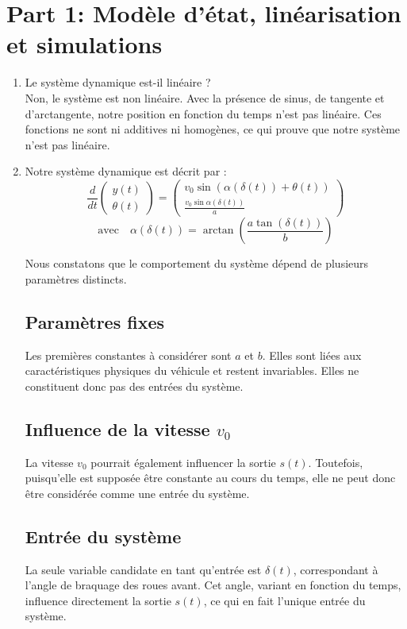 \documentclass[a4paper, 11pt]{article}
\begin{document}
\section*{Part 1: Modèle d'état, linéarisation et simulations}
\begin{enumerate}
    \item 
    Le système dynamique est-il linéaire ? \\
Non, le système est non linéaire. Avec la présence de sinus, de tangente et d'arctangente, notre position en fonction du temps n'est pas linéaire. Ces fonctions ne sont ni additives ni homogènes, ce qui prouve que notre système n'est pas linéaire.

    \item 
    
Notre système dynamique est décrit par :  
\[
\frac{d}{dt} 
\begin{pmatrix} 
y(t) \\ \theta(t) 
\end{pmatrix} 
=
\begin{pmatrix} 
v_0 \sin(\alpha(\delta(t)) + \theta(t)) \\ 
\frac{v_0 \sin \alpha(\delta(t))}{a} 
\end{pmatrix}
\]
\[
\text{avec} \quad \alpha(\delta(t)) = \arctan \left( \frac{a \tan(\delta(t))}{b} \right)
\]

Nous constatons que le comportement du système dépend de plusieurs paramètres distincts.  

\subsection*{Paramètres fixes}  
Les premières constantes à considérer sont \( a \) et \( b \). Elles sont liées aux caractéristiques physiques du véhicule et restent invariables. Elles ne constituent donc pas des entrées du système.  

\subsection*{Influence de la vitesse \( v_0 \)}  
La vitesse \( v_0 \) pourrait également influencer la sortie \( s(t) \). Toutefois, puisqu'elle est supposée être constante au cours du temps, elle ne peut donc être considérée comme une entrée du système.  

\subsection*{Entrée du système}  
La seule variable candidate en tant qu’entrée est \( \delta(t) \), correspondant à l’angle de braquage des roues avant. Cet angle, variant en fonction du temps, influence directement la sortie \( s(t) \), ce qui en fait l’unique entrée du système.    


\end{enumerate}
\end{document}
